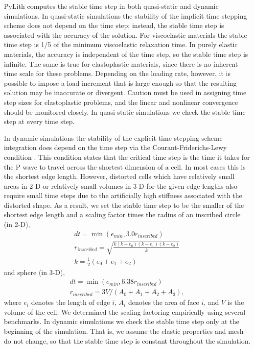 PyLith computes the stable time step in both quasi-static and dynamic
simulations. In quasi-static simulations the stability of the implicit
time stepping scheme does not depend on the time step; instead, the
stable time step is associated with the accuracy of the solution.
For viscoelastic materials the stable time step is 1/5 of the minimum
viscoelastic relaxation time. In purely elastic materials, the accuracy
is independent of the time step, so the stable time step is infinite.
The same is true for elastoplastic materials, since there is no inherent
time scale for these problems. Depending on the loading rate, however,
it is possible to impose a load increment that is large enough so
that the resulting solution may be inaccurate or divergent. Caution
must be used in assigning time step sizes for elastoplastic problems,
and the linear and nonlinear convergence should be monitored closely.
In quasi-static simulations we check the stable time step at every
time step. 

In dynamic simulations the stability of the explicit time stepping
scheme integration does depend on the time step via the Courant-Friderichs-Lewy
condition \cite{Courant:etal:1967}. This condition states that the
critical time step is the time it takes for the P wave to travel across
the shortest dimension of a cell. In most cases this is the shortest
edge length. However, distorted cells which have relatively small
areas in 2-D or relatively small volumes in 3-D for the given edge
lengths also require small time steps due to the artificially high
stiffness associated with the distorted shape. As a result, we set
the stable time step to be the smaller of the shortest edge length
and a scaling factor times the radius of an inscribed circle (in 2-D),
\begin{gather}
dt=\min(e_{\mathit{min}},3.0r_{inscribed})\\
r_{inscribed}=\sqrt{\frac{k(k-e_{0})(k-e_{1})(k-e_{2})}{k}}\\
k=\frac{1}{2}(e_{0}+e_{1}+e_{2})
\end{gather}
and sphere (in 3-D),
\begin{gather}
dt=\min(e_{\mathit{min}},6.38r_{inscribed})\\
r_{inscribed}=3V/(A_{0}+A_{1}+A_{2}+A_{3}),
\end{gather}
where $e_{i}$ denotes the length of edge $i$, $A_{i}$ denotes the
area of face $i$, and $V$ is the volume of the cell. We determined
the scaling factoring empirically using several benchmarks. In dynamic
simulations we check the stable time step only at the beginning of
the simulation. That is, we assume the elastic properties and mesh
do not change, so that the stable time step is constant throughout
the simulation.

